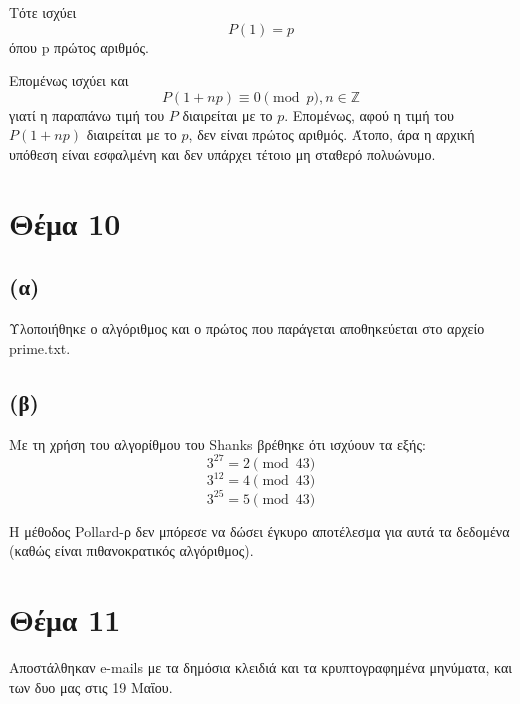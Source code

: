\documentclass[a4paper, 11pt]{article}
\newcommand{\lt}{\latintext}
\begin{document}
Τότε ισχύει
\[P(1) = p\]
όπου p πρώτος αριθμός.

Επομένως ισχύει και
\[P(1 + np) \equiv 0 \pmod{p}, n \in \mathbb{Z} \]
γιατί η παραπάνω τιμή του $P$ διαιρείται με το $p$. Επομένως, αφού η τιμή του $P(1+np)$ διαιρείται με το $p$, δεν είναι πρώτος αριθμός. Άτοπο, άρα η αρχική υπόθεση είναι εσφαλμένη και δεν υπάρχει τέτοιο μη σταθερό πολυώνυμο.

\section*{Θέμα 10}
\subsection*{(α)} Υλοποιήθηκε ο αλγόριθμος και ο πρώτος που παράγεται αποθηκεύεται στο αρχείο {\lt prime.txt}.
\subsection*{(β)} Με τη χρήση του αλγορίθμου του {\lt Shanks} βρέθηκε ότι ισχύουν τα εξής:
\[3^{27} = 2 \pmod{43}\]
\[3^{12} = 4 \pmod{43}\]
\[3^{25} = 5 \pmod{43}\]

Η μέθοδος {\lt Pollard-}ρ δεν μπόρεσε να δώσει έγκυρο αποτέλεσμα για αυτά τα δεδομένα (καθώς είναι πιθανοκρατικός αλγόριθμος).

\section*{Θέμα 11}
Αποστάλθηκαν {\lt e-mails} με τα δημόσια κλειδιά και τα κρυπτογραφημένα μηνύματα, και των δυο μας στις 19 Μαΐου.
\end{document}
